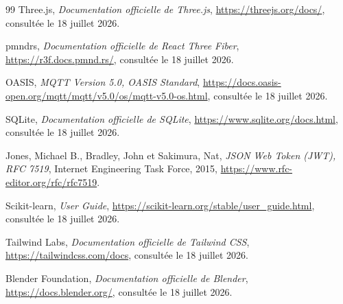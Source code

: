 \documentclass[12pt,a4paper]{report}
\begin{document}
\begin{thebibliography}{99}
Three.js,
\textit{Documentation officielle de Three.js},
\url{https://threejs.org/docs/},
consultée le 18 juillet 2026.

pmndrs,
\textit{Documentation officielle de React Three Fiber},
\url{https://r3f.docs.pmnd.rs/},
consultée le 18 juillet 2026.

OASIS,
\textit{MQTT Version 5.0, OASIS Standard},
\url{https://docs.oasis-open.org/mqtt/mqtt/v5.0/os/mqtt-v5.0-os.html},
consultée le 18 juillet 2026.

SQLite,
\textit{Documentation officielle de SQLite},
\url{https://www.sqlite.org/docs.html},
consultée le 18 juillet 2026.

Jones, Michael B., Bradley, John et Sakimura, Nat,
\textit{JSON Web Token (JWT), RFC 7519},
Internet Engineering Task Force, 2015,
\url{https://www.rfc-editor.org/rfc/rfc7519}.

Scikit-learn,
\textit{User Guide},
\url{https://scikit-learn.org/stable/user_guide.html},
consultée le 18 juillet 2026.

Tailwind Labs,
\textit{Documentation officielle de Tailwind CSS},
\url{https://tailwindcss.com/docs},
consultée le 18 juillet 2026.

Blender Foundation,
\textit{Documentation officielle de Blender},
\url{https://docs.blender.org/},
consultée le 18 juillet 2026.

\end{thebibliography}
\end{document}
